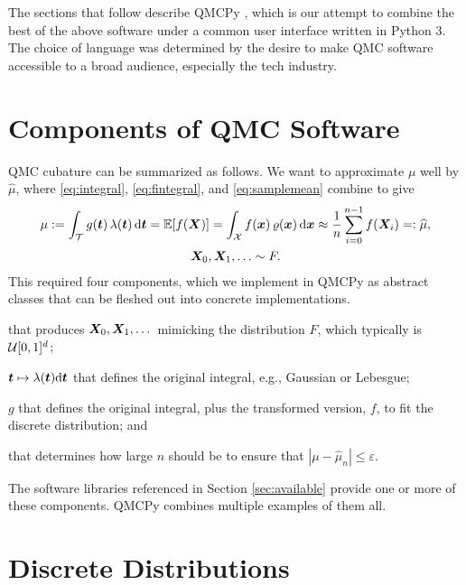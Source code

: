 \documentclass[graybox,footinfo]{svmult}
\newcommand{\QMCPYabs}[1]{\ensuremath{{\left \lvert #1 \right \rvert}}}
\newcommand{\hmu}{\widehat{\mu}}
\begin{document}
The sections that follow describe QMCPy \cite{QMCPy2020a}, which is our attempt to combine the best of the above software under a common user interface written in Python 3.  The choice of language was determined by the desire to make QMC software accessible to a broad audience, especially the tech industry.


\section{Components of QMC Software}
QMC cubature can be summarized as follows.  We want to approximate $\mu$ well by $\hmu$, where \eqref{eq:integral}, \eqref{eq:fintegral}, and \eqref{eq:samplemean} combine to give
\begin{multline} \label{eq:cubSummary}
	\mu : = \int_\calT g(\bst) \, \lambda(\bst) \, \D \bst  = \bbE[f(\bsX)] = \int_\calX f(\bsx) \, \varrho(\bsx) \, \D \bsx \approx \frac 1n \sum_{i=0}^{n-1} f(\bsX_i) =: \hmu, \\
	 \bsX_0, \bsX_1, \ldots \sim F.
\end{multline}
This required four components, which we implement in QMCPy as abstract classes that can be fleshed out into concrete implementations.

\begin{description}[format=\textup,format=\textbf]
	
	\item[Discrete Distribution] that produces ${\boldsymbol{X}}_0, {\boldsymbol{X}}_1, \dots$ mimicking the distribution $F$, which typically is ${\mathcal{U}}[0,1]^d$;
	
	\item[True Measure] ${\boldsymbol{t}} \mapsto \lambda ({\boldsymbol{t}}) \mathrm{d} {\boldsymbol{t}}$ that defines the original integral, e.g., Gaussian or Lebesgue;
	
	\item[Integrand] $g$ that  defines the original integral, plus the transformed version, $f$, to fit the discrete distribution; and
	
	\item[Stopping Criterion] that determines how large $n$ should be to ensure that $\QMCPYabs{\mu - \hmu_n} \le \varepsilon$.
\end{description}

The software libraries referenced in Section \ref{sec:available} provide one or more of these components.  QMCPy combines multiple examples of them all.


\section{Discrete Distributions}
\end{document}
